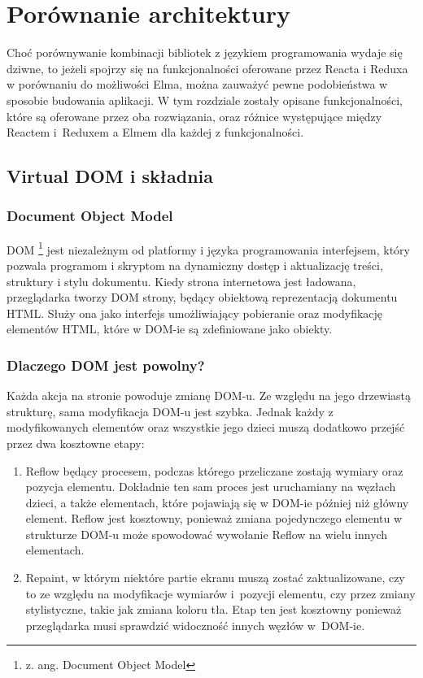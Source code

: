 \chapter{Porównanie architektury} \label{chap:porownanie}
Choć porównywanie kombinacji bibliotek z językiem programowania wydaje się dziwne, to jeżeli spojrzy się na funkcjonalności oferowane przez Reacta i Reduxa w porównaniu do możliwości Elma, można zauważyć pewne podobieństwa w sposobie budowania aplikacji. W tym rozdziale zostały opisane funkcjonalności, które są oferowane przez oba rozwiązania, oraz różnice występujące między Reactem i~Reduxem a Elmem dla każdej z funkcjonalności.

\section{Virtual DOM i składnia}
\subsection{Document Object Model}
DOM \footnote{z. ang. Document Object Model} jest niezależnym od platformy i języka programowania interfejsem, który pozwala programom i skryptom na dynamiczny dostęp i aktualizację treści, struktury i stylu dokumentu. Kiedy strona internetowa jest ładowana, przeglądarka tworzy DOM strony, będący obiektową reprezentacją dokumentu HTML. Służy ona jako interfejs umożliwiający pobieranie oraz modyfikację elementów HTML, które w DOM-ie są zdefiniowane jako obiekty.

\subsection{Dlaczego DOM jest powolny?}
Każda akcja na stronie powoduje zmianę DOM-u. Ze względu na jego drzewiastą strukturę, sama modyfikacja DOM-u jest szybka. Jednak każdy z modyfikowanych elementów oraz wszystkie jego dzieci muszą dodatkowo przejść przez dwa kosztowne etapy:
\begin{enumerate}
	\item Reflow będący procesem, podczas którego przeliczane zostają wymiary oraz pozycja elementu. Dokładnie ten sam proces jest uruchamiany na węzłach dzieci, a także elementach, które pojawiają się w DOM-ie później niż główny element. Reflow jest kosztowny, ponieważ zmiana pojedynczego elementu w strukturze DOM-u może spowodować wywołanie Reflow na wielu innych elementach.
	\item Repaint, w którym niektóre partie ekranu muszą zostać zaktualizowane, czy to ze względu na modyfikacje wymiarów i~pozycji elementu, czy przez zmiany stylistyczne, takie jak zmiana koloru tła. Etap ten jest kosztowny ponieważ przeglądarka musi sprawdzić widoczność innych węzłów w~DOM-ie.
\end{enumerate} 


